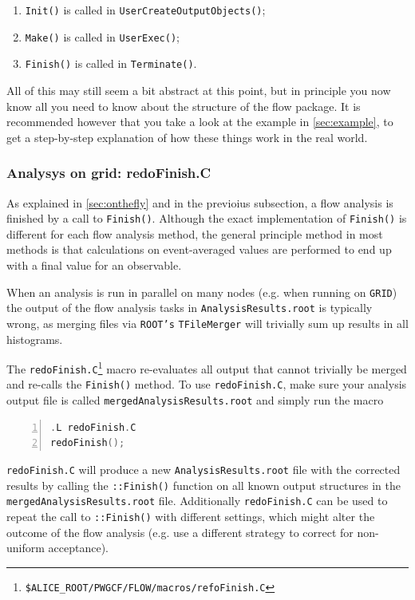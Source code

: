 \documentclass[a4paper]{book}
\numberwithin{equation}{subsection}
\begin{document}
\begin{enumerate}
\item \texttt{Init()} is called in \texttt{UserCreateOutputObjects()};
\item \texttt{Make()} is called in \texttt{UserExec()};
\item \texttt{Finish()} is called in \texttt{Terminate()}.
\end{enumerate}
All of this may still seem a bit abstract at this point, but in principle you now know all you need to know about the structure of the flow package. It is recommended however that you take a look at the example in \ref{sec:example}, to get a step-by-step explanation of how these things work in the real world.

\subsubsection{Analysys on grid: redoFinish.C}
As explained in \ref{sec:onthefly} and in the previoius subsection, a flow analysis is finished by a call to \texttt{Finish()}. Although the exact implementation of \texttt{Finish()} is different for each flow analysis method, the general principle method in most methods is that calculations on event-averaged values are performed to end up with a final value for an observable. 

 When an analysis is run in parallel on many nodes (e.g. when running on \texttt{GRID}) the output of the flow analysis tasks in \texttt{AnalysisResults.root} is typically wrong, as merging files via \texttt{ROOT's} \texttt{TFileMerger} will trivially sum up results in all histograms. 

The \texttt{redoFinish.C}\footnote{\texttt{\$ALICE\_ROOT/PWGCF/FLOW/macros/refoFinish.C}} macro re-evaluates all output that cannot trivially be merged and re-calls the \texttt{Finish()} method. To use \texttt{redoFinish.C}, make sure your analysis output file is called \texttt{mergedAnalysisResults.root} and simply run the macro
\begin{lstlisting}[language=C, numbers=left]
.L redoFinish.C
redoFinish(); \end{lstlisting}
\texttt{redoFinish.C} will produce a new \texttt{AnalysisResults.root} file with the corrected results by calling the \texttt{::Finish()} function on all known output structures in the \texttt{mergedAnalysisResults.root} file. Additionally \texttt{redoFinish.C} can be used to repeat the call to \texttt{::Finish()} with different settings, which might alter the outcome of the flow analysis (e.g. use a different strategy to correct for non-uniform acceptance). 
\end{document}
